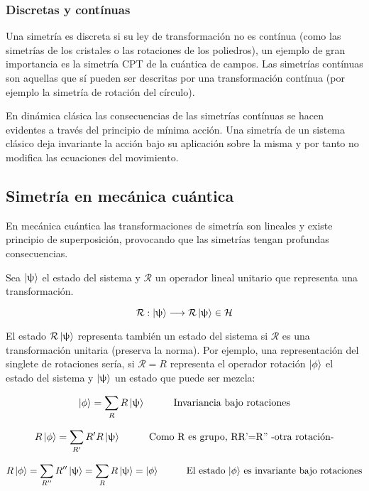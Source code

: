 \documentclass{article}
\begin{document}
\subsubsection{Discretas y contínuas}

Una simetría es discreta si su ley de transformación no es contínua (como las simetrías de los cristales o las rotaciones de los poliedros), un ejemplo de gran importancia es la simetría CPT de la cuántica de campos. Las simetrías contínuas son aquellas que sí pueden ser descritas por una transformación contínua (por ejemplo la simetría de rotación del círculo).

\smallskip
En dinámica clásica las consecuencias de las simetrías contínuas se hacen evidentes a través del principio de mínima acción. Una simetría de un sistema clásico deja invariante la acción bajo su aplicación sobre la misma y por tanto no modifica las ecuaciones del movimiento.

\subsection{Simetría en mecánica cuántica}

En mecánica cuántica las transformaciones de simetría son lineales y existe principio de superposición, provocando que las simetrías tengan profundas consecuencias.

Sea $\ket{\uppsi}$ el estado del sistema y $\mathcal{R}$ un operador lineal unitario que representa una transformación.

$$\mathcal{R}:\ket{\uppsi}\longrightarrow \mathcal{R}\ket{\uppsi}\in \mathcal{H}$$

El estado $\mathcal{R}\ket{\uppsi}$ representa también un estado del sistema si $\mathcal{R}$ es una transformación unitaria (preserva la norma). Por ejemplo, una representación del singlete de rotaciones sería, si $\mathcal{R}=R$ representa el operador rotación $\ket{\phi}$ el estado del sistema y $\ket{\uppsi}$ un estado que puede ser mezcla:

$$\ket{\phi} = \sum _R R\ket{\uppsi} \hspace{1cm} \text{Invariancia bajo rotaciones}$$ 

$$R\ket{\phi}=\sum _{R'}R'R\ket{\uppsi} \hspace{1cm} \text{Como R es grupo, RR'=R'' -otra rotación-}$$

$$R\ket{\phi}= \sum _{R''}R''\ket{\uppsi}=\sum _R R\ket{\uppsi}=\ket{\phi} \hspace{1cm} \text{El estado $\ket{\phi}$ es invariante bajo rotaciones}$$
\end{document}
